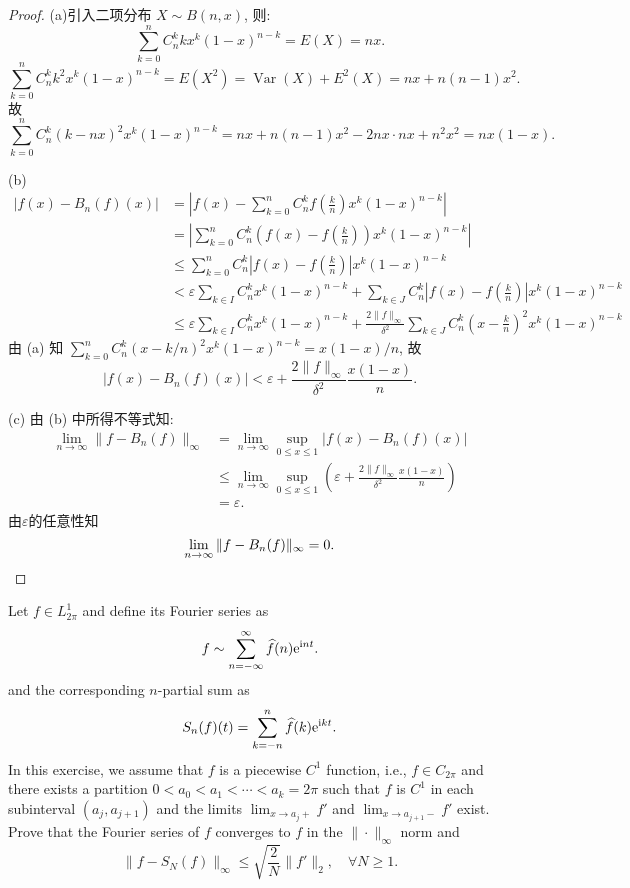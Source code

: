 \begin{proof}
(a)引入二项分布 $X\sim B(n,x)$, 则:
\[\sum_{k=0}^nC_n^kkx^k(1-x)^{n-k} = E(X) = nx.\]
\[\sum_{k=0}^nC_n^kk^2x^k(1-x)^{n-k}=E(X^2)=\operatorname{Var}(X)+E^2(X)=nx+n(n-1)x^2.\]
故
\[\sum_{k=0}^nC_n^k(k-nx)^2x^k(1-x)^{n-k}=nx+n(n-1)x^2-2nx\cdot nx+n^2x^2=nx(1-x).\]

(b)
\begin{align*}
  |f(x)-B_n(f)(x)|
  & = \left|f(x)-\sum_{k=0}^nC_n^kf\left(\frac{k}{n}\right)x^k(1-x)^{n-k}\right| \\
  & = \left|\sum_{k=0}^nC_n^k\left(f(x)-f\left(\frac{k}{n}\right)\right)x^k(1-x)^{n-k}\right| \\
  & \leq \sum_{k=0}^nC_n^k\left|f(x)-f\left(\frac{k}{n}\right)\right|x^k(1-x)^{n-k} \\
  & < \varepsilon\sum_{k\in I}C_n^kx^k(1-x)^{n-k}
      + \sum_{k\in J}C_n^k\left|f(x)-f\left(\frac{k}{n}\right)\right|x^k(1-x)^{n-k} \\
  & \leq \varepsilon\sum_{k\in I}C_n^kx^k(1-x)^{n-k}
      + \frac{2\|f\|_{\infty}}{\delta^2}
        \sum_{k\in J}C_n^k\left(x-\frac{k}{n}\right)^2x^k(1-x)^{n-k}
\end{align*}
由 (a) 知 $\sum_{k=0}^nC_n^k(x-k/n)^2x^k(1-x)^{n-k}=x(1-x)/n$, 故
\[|f(x)-B_n(f)(x)|<\varepsilon+\frac{2\|f\|_{\infty}}{\delta^2}\frac{x(1-x)}{n}.\]

(c) 由 (b) 中所得不等式知:
\[\begin{split}
  \lim_{n\to\infty}\|f-B_n(f)\|_{\infty}
  & =\lim_{n\to\infty}\sup\limits_{0\leq x\leq 1}|f(x)-B_n(f)(x)| \\
  & \leq \lim_{n\to\infty}\sup \limits_{0\leq x\leq 1}
    \left(\varepsilon+\frac{2\|f\|_{\infty}}{\delta^2}\frac{x(1-x)}{n}\right) \\
  & = \varepsilon.
\end{split}\]
由$\varepsilon$的任意性知
\[\lim_{n\to\infty}\|f-B_n(f)\|_{\infty}=0.\qedhere\]
\end{proof}


\begin{exercise}[15]
  Let $f\in L_{2\pi}^1$ and define its Fourier series as
  \[f \sim \sum_{n=-\infty}^\infty \widehat{f}(n) \mathrm{e}^{\mathrm{i} nt}.\]
  and the corresponding $n$-partial sum as
  \[S_n(f)(t) = \sum_{k=-n}^n \widehat{f}(k) \mathrm{e}^{\mathrm{i} kt}.\]
  In this exercise, we assume that $f$ is a piecewise $C^1$ function, i.e.,
  $f\in C_{2\pi}$ and there exists a partition $0<a_0<a_1<\cdots<a_k=2\pi$
  such that $f$ is $C^1$ in each subinterval $(a_j,a_{j+1})$
  and the limits $\lim_{x\to a_j+} f'$ and $\lim_{x\to a_{j+1}-} f'$ exist.
  Prove that the Fourier series of $f$ converges to $f$ in the $\|\cdot\|_\infty$ norm and
  \[\|f - S_N(f)\|_\infty \leq \sqrt{\frac{2}{N}} \|f'\|_2,\quad \forall N\geq 1.\]
\end{exercise}

